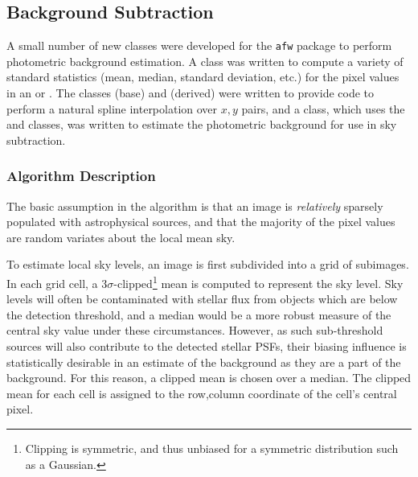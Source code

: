 
\subsection{Background Subtraction}
\label{secBackground}


A small number of new classes were developed for the {\tt afw} package
to perform photometric background estimation.  A 
class was written to compute a variety of standard statistics (mean,
median, standard deviation, etc.) for the pixel values in an
 or .  The classes 
(base) and  (derived) were written to provide
code to perform a natural spline interpolation over $x,y$ pairs, 
and a  class, which uses the  and
 classes, was written to estimate the photometric
background for use in sky subtraction.

\subsubsection{Algorithm Description}

The basic assumption in the algorithm is that an image is {\it
relatively} sparsely populated with astrophysical sources, and that the
majority of the pixel values are random variates about the local mean
sky.


To estimate local sky levels, an image is first subdivided into a grid
of subimages.  In each grid cell, a
3$\sigma$-clipped\footnote{Clipping is symmetric, and thus unbiased 
for a symmetric distribution such as a Gaussian.} mean is computed to
represent the sky level.  Sky levels will often be contaminated with
stellar flux from objects which are below the detection threshold, and
a median would be a more robust measure of the central sky value under
these circumstances.  However, as such sub-threshold sources will also
contribute to the detected stellar PSFs, their biasing influence is
statistically desirable in an estimate of the background as they are a
part of the background.  For this reason, a clipped mean is chosen
over a median.  The clipped mean for each cell is assigned to the
row,column coordinate of the cell's central pixel. 

